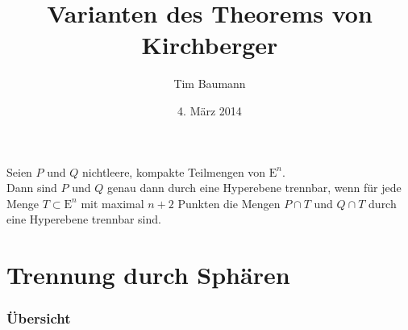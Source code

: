 \documentclass{beamer}
\title{Varianten des Theorems von Kirchberger}
\author{Tim Baumann}
\institute{TopMath-Frühlingsschule in Oberschönenfeld}
\date{4. März 2014}
\newcommand{\E}{\mathrm{E}}
\begin{document}
\begin{frame}[plain]
  \titlepage
\end{frame}

\begin{frame}[plain]
  \begin{theorem}[Kirchberger]
    Seien $P$ und $Q$ nichtleere, kompakte Teilmengen von $\E^n$. \\
    Dann sind $P$ und $Q$ genau dann durch eine \alert<2>{Hyperebene} trennbar, wenn für jede Menge $T \subset \E^n$ mit maximal $n + 2$ Punkten die Mengen $P \cap T$ und $Q \cap T$ durch eine \alert<2>{Hyperebene} trennbar sind.
  \end{theorem}
\end{frame}

\section{Trennung durch Sphären}
\begin{frame}
  \frametitle{Übersicht}
  \tableofcontents[currentsection]
\end{frame}
\end{document}
